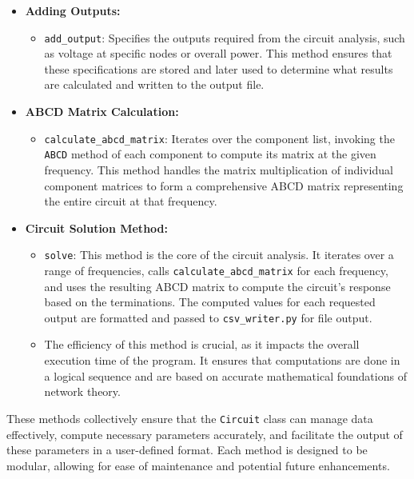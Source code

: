 \documentclass[conference]{IEEEtran}
\begin{document}
\begin{itemize}
\item \textbf{Adding Outputs:}
        \begin{itemize}
        \item \texttt{add\_output}: Specifies the outputs required from the circuit analysis, such as voltage at specific 
        nodes or overall power. This method ensures that these specifications are stored and later used to determine what 
        results are calculated and written to the output file.
        \end{itemize}

\item \textbf{ABCD Matrix Calculation:}
        \begin{itemize}
        \item \texttt{calculate\_abcd\_matrix}: Iterates over the component list, invoking the \texttt{ABCD} method of each 
        component to compute its matrix at the given frequency. This method handles the matrix multiplication of individual
            component matrices to form a comprehensive ABCD matrix representing the entire circuit at that frequency.
        \end{itemize}

\item \textbf{Circuit Solution Method:}
        \begin{itemize}
        \item \texttt{solve}: This method is the core of the circuit analysis. It iterates over a range of frequencies, 
        calls \texttt{calculate\_abcd\_matrix} for each frequency, and uses the resulting ABCD matrix to compute the 
        circuit's response based on the terminations. The computed values for each requested output are formatted and 
        passed to \texttt{csv\_writer.py} for file output.
        \item The efficiency of this method is crucial, as it impacts the overall execution time of the program. It 
        ensures that computations are done in a logical sequence and are based on accurate mathematical foundations of network theory.
        \end{itemize}
\end{itemize}

These methods collectively ensure that the \texttt{Circuit} class can manage data effectively, compute necessary 
parameters accurately, and facilitate the output of these parameters in a user-defined format. Each method is 
designed to be modular, allowing for ease of maintenance and potential future enhancements.
\end{document}
